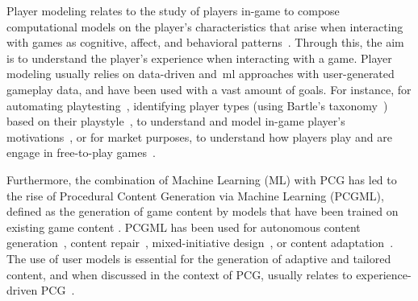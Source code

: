 Player modeling relates to the study of players in-game to compose computational models on the player's characteristics that arise when interacting with games as cognitive, affect, and behavioral patterns~\cite{yannakakis_player_2013,thawonmas_artificial_2019}. Through this, the aim is to understand the player's experience when interacting with a game. Player modeling usually relies on data-driven and~\acrshort{ml} approaches with user-generated gameplay data, and have been used with a vast amount of goals. For instance, for automating playtesting~\cite{holmgard_automated_2019,gudmundsson_human-like_2018}, identifying player types (using Bartle's taxonomy~\cite{bartle_hearts_1996}) based on their playstyle~\cite{drachen_player_2009}, to understand and model in-game player's motivations~\cite{melhart_your_2019}, or for market purposes, to understand how players play and are engage in free-to-play games~\cite{saas_discovering_2016,rio_time_2020,guitart_forecasting_2019}.


Furthermore, the combination of Machine Learning (ML) with PCG has led to the rise of Procedural Content Generation via Machine Learning (PCGML), defined as the generation of game content by models that have been trained on existing game content \cite{summerville_procedural_2018}. PCGML has been used for autonomous content generation~\cite{sarkar_towards_2020}, content repair~\cite{siper_path_2022}, mixed-initiative design~\cite{guzdial_co-creative_2018}, or content adaptation~\cite{gonzalez-duque_fast_2021}. The use of user models is essential for the generation of adaptive and tailored content, and when discussed in the context of PCG, usually relates to experience-driven PCG~\cite{yannakakis_experience-driven_2011}. 


